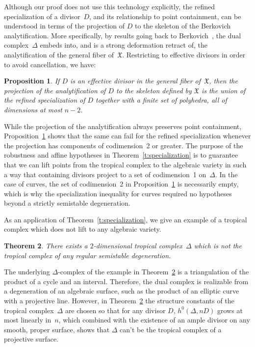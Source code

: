 \documentclass[11pt]{amsart}
\newtheorem{thm}{Theorem}[section]
\newtheorem{prop}[thm]{Proposition}
\theoremstyle{definition}
\newcommand{\X}{\mathfrak X}
\begin{document}
Although our proof does not use this technology explicitly, the refined
specialization of a divisor~$D$, and its relationship to point containment, can
be understood in terms of the projection of $D$ to the skeleton of the
Berkovich analytification. More specifically, by results going back to
Berkovich~\cite{berkovich}, the dual complex~$\Delta$ embeds into, and is a
strong deformation retract of, the analytification of the general fiber of~$\X$.
Restricting to effective divisors in order to avoid cancellation, we have:
\begin{prop}\label{p:analytification} If $D$ is an effective divisor in the
general fiber of~$\X$, then the projection of the analytification of $D$ to the
skeleton defined by $\X$ is the union of the refined specialization of $D$
together with a finite set of polyhedra, all of dimensions at most $n-2$.
\end{prop}

While the projection of the analytification always preserves point containment,
Proposition~\ref{p:analytification} shows that the same can fail for the
refined specialization whenever the projection has components of codimension~2
or greater. The purpose of the robustness and affine hypotheses in
Theorem~\ref{t:specialization} is to guarantee that we can lift points from the
tropical complex to the algebraic variety in such a way that containing divisors
project to a set of codimension~1 on~$\Delta$. In the case of
curves, the set of codimension~2 in Proposition~\ref{p:analytification} is
necessarily empty, which is why the specialization inequality for curves
required no hypotheses beyond a strictly semistable degeneration.

As an application of Theorem~\ref{t:specialization}, we give an example of a
tropical complex which does not lift to any algebraic variety.

\begin{thm}\label{t:no-lift}
There exists a $2$-dimensional tropical complex~$\Delta$ which is not the
tropical complex of any regular semistable degeneration.
\end{thm}

\noindent The underlying $\Delta$-complex of the example in
Theorem~\ref{t:no-lift} is a triangulation of the product of a cycle and an
interval. Therefore, the dual complex is realizable from a degeneration of an
algebraic surface, such as the product of an elliptic curve with a projective
line. However, in Theorem~\ref{t:no-lift} the structure constants of the
tropical complex~$\Delta$ are chosen so that for any divisor $D$, $h^0(\Delta,
nD)$ grows at most linearly in~$n$, which combined with the existence of an
ample divisor on any smooth, proper surface, shows that $\Delta$ can't be the
tropical complex of a projective surface.
\end{document}
